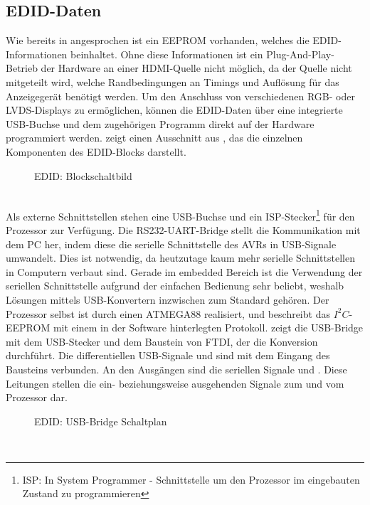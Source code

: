 \subsection{EDID-Daten}
\label{cha:sw_edid_daten}
Wie bereits in  angesprochen ist ein EEPROM vorhanden, welches die EDID-Informationen beinhaltet. Ohne diese Informationen ist ein Plug-And-Play-Betrieb der Hardware an einer HDMI-Quelle nicht möglich, da der Quelle nicht mitgeteilt wird, welche Randbedingungen an Timings und Auflösung für das Anzeigegerät benötigt werden. Um den Anschluss von verschiedenen RGB- oder LVDS-Displays zu ermöglichen, können die EDID-Daten über eine integrierte USB-Buchse und dem zugehörigen Programm direkt auf der Hardware programmiert werden.  zeigt einen Ausschnitt aus , das die einzelnen Komponenten des EDID-Blocks darstellt. 
\begin{figure}[htp]
	\center
    \caption{EDID: Blockschaltbild}
    \label{fig:teilb_edid_blockschaltbild}
\end{figure}\\
Als externe Schnittstellen stehen eine USB-Buchse und ein ISP-Stecker\footnote{ISP: In System Programmer - Schnittstelle um den Prozessor im eingebauten Zustand zu programmieren} für den Prozessor zur Verfügung. Die RS232-UART-Bridge stellt die Kommunikation mit dem PC her, indem diese die serielle Schnittstelle des AVRs in USB-Signale umwandelt. Dies ist notwendig, da heutzutage kaum mehr serielle Schnittstellen in Computern verbaut sind. Gerade im embedded Bereich ist die Verwendung der seriellen Schnittstelle aufgrund der einfachen Bedienung sehr beliebt, weshalb Lösungen mittels USB-Konvertern inzwischen zum Standard gehören. Der Prozessor selbst ist durch einen ATMEGA88 realisiert, und beschreibt das $I^2C$-EEPROM mit einem in der Software hinterlegten Protokoll. 
 zeigt die USB-Bridge mit dem USB-Stecker und dem Baustein  von FTDI, der die Konversion durchführt. Die differentiellen USB-Signale  und  sind mit dem Eingang des Bausteins verbunden. An den Ausgängen sind die seriellen Signale  und . Diese Leitungen stellen die ein- beziehungsweise ausgehenden Signale zum und vom Prozessor dar.
\begin{figure}[htp]
	\center
    \caption{EDID: USB-Bridge Schaltplan}
    \label{fig:teilb_edid_usb_sch}
\end{figure}\\
